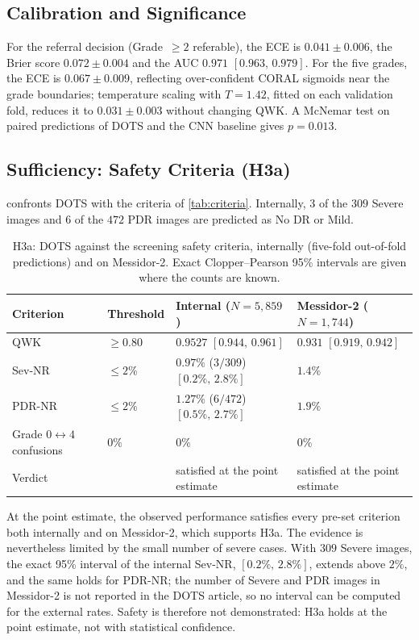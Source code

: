 \subsection{Calibration and Significance}
\label{sec:dots-calib}

For the referral decision (Grade~$\geq2$ referable), the ECE is $0.041\pm0.006$, the Brier
score $0.072\pm0.004$ and the AUC $0.971$ $[0.963,\,0.979]$. For the five grades, the ECE
is $0.067\pm0.009$, reflecting over-confident CORAL sigmoids near the grade boundaries;
temperature scaling with $T=1.42$, fitted on each validation fold, reduces it to
$0.031\pm0.003$ without changing QWK. A McNemar test on paired predictions of DOTS and the
CNN baseline gives $p=0.013$.

\subsection{Sufficiency: Safety Criteria (H3a)}
\label{sec:h3a-eval}

 confronts DOTS with the criteria of \cref{tab:criteria}. Internally, $3$ of
the $309$ Severe images and $6$ of the $472$ PDR images are predicted as No DR or Mild.

\begin{table}[H]
\centering
\caption[H3a: DOTS against the screening safety criteria]{H3a: DOTS against the screening
safety criteria, internally (five-fold out-of-fold predictions) and on Messidor-2. Exact
Clopper--Pearson 95\% intervals are given where the counts are known.}
\label{tab:h3a}
\small
\begin{tabular}{@{}P{3.0cm}lP{4.6cm}P{3.4cm}@{}}
\toprule
Criterion & Threshold & Internal ($N=5{,}859$) & Messidor-2 ($N=1{,}744$) \\
\midrule
QWK & $\geq0.80$ & $0.9527$ $[0.944,\,0.961]$ & $0.931$ $[0.919,\,0.942]$ \\
Sev-NR & $\leq2\%$ & $0.97\%$ ($3/309$) $[0.2\%,\,2.8\%]$ & $1.4\%$ \\
PDR-NR & $\leq2\%$ & $1.27\%$ ($6/472$) $[0.5\%,\,2.7\%]$ & $1.9\%$ \\
Grade $0\leftrightarrow4$ confusions & $0\%$ & $0\%$ & $0\%$ \\
\midrule
Verdict & & satisfied at the point estimate & satisfied at the point estimate \\
\bottomrule
\end{tabular}
\end{table}

At the point estimate, the observed performance satisfies every pre-set criterion both
internally and on Messidor-2, which supports H3a. The evidence is nevertheless limited by the small number of severe cases. With
$309$ Severe images, the exact 95\% interval of the internal Sev-NR, $[0.2\%,\,2.8\%]$,
extends above $2\%$, and the same holds for PDR-NR; the number of Severe and PDR images in
Messidor-2 is not reported in the DOTS article, so no interval can be computed for the
external rates. Safety is therefore not demonstrated: H3a holds at the point estimate, not with
statistical confidence.

